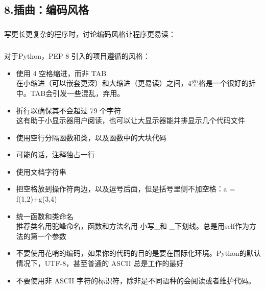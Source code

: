 \documentclass{article}
\begin{document}
\begin{CJK}{UTF8}{gbsn}
\section*{8.插曲：编码风格}
\subparagraph*{}
写更长更复杂的程序时，讨论编码风格让程序更易读：
\subparagraph*{}
对于Python，PEP 8 引入的项目遵循的风格：
\begin{itemize}
  \item 使用 4 空格缩进，而非 TAB\\
  在小缩进（可以嵌套更深）和大缩进（更易读）之间，4空格是一个很好的折中。TAB会引发一些混乱，弃用。
  \item 折行以确保其不会超过 79 个字符\\
  这有助于小显示器用户阅读，也可以让大显示器能并排显示几个代码文件
  \item 使用空行分隔函数和类，以及函数中的大块代码
  \item 可能的话，注释独占一行
  \item 使用文档字符串
  \item 把空格放到操作符两边，以及逗号后面，但是括号里侧不加空格：a = f(1,2)+g(3,4)
  \item 统一函数和类命名\\
  推荐类名用驼峰命名，函数和方法名用 小写\_{}和
  \_{}下划线。总是用self作为方法的第一个参数
  \item 不要使用花哨的编码，如果你的代码的目的是要在国际化环境。Python的默认情况下，UTF-8，甚至普通的 ASCII 总是工作的最好
  \item 不要使用非 ASCII 字符的标识符，除非是不同语种的会阅读或者维护代码。
\end{itemize}
\end{CJK}
\end{document}
